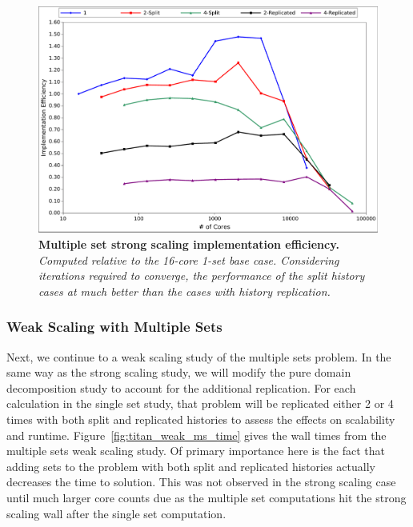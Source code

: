 \begin{figure}[t!]
  \begin{center}
    \includegraphics[width=6in]{chapters/parallel_mc/titan_strong_ms_impeff.pdf}
  \end{center}
  \caption{\textbf{Multiple set strong scaling implementation
      efficiency.} \textit{Computed relative to the 16-core 1-set base
      case. Considering iterations required to converge, the
      performance of the split history cases at much better than the
      cases with history replication.}}
  \label{fig:titan_strong_ms_impeff}
\end{figure}

\clearpage

\subsubsection{Weak Scaling with Multiple Sets}
\label{subsubsec:ms_weak}

Next, we continue to a weak scaling study of the multiple sets
problem. In the same way as the strong scaling study, we will modify
the pure domain decomposition study to account for the additional
replication. For each calculation in the single set study, that
problem will be replicated either 2 or 4 times with both split and
replicated histories to assess the effects on scalability and
runtime. Figure~\ref{fig:titan_weak_ms_time} gives the wall times from
the multiple sets weak scaling study. Of primary importance here is
the fact that adding sets to the problem with both split and
replicated histories actually decreases the time to solution. This was
not observed in the strong scaling case until much larger core counts
due as the multiple set computations hit the strong scaling wall after
the single set computation. 


